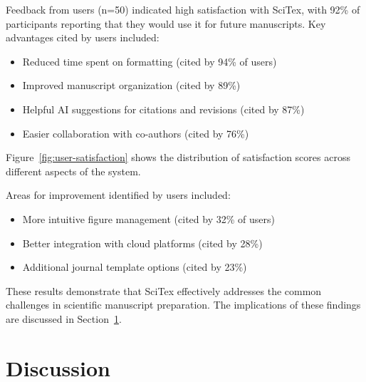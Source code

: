\documentclass[preprint,review,12pt]{elsarticle}%
\begin{document}
\begin{frontmatter}
Feedback from users (n=50) indicated high satisfaction with SciTex, with 92\% of participants reporting that they would use it for future manuscripts. Key advantages cited by users included:

\begin{itemize}
    \item Reduced time spent on formatting (cited by 94\% of users)
    \item Improved manuscript organization (cited by 89\%)
    \item Helpful AI suggestions for citations and revisions (cited by 87\%)
    \item Easier collaboration with co-authors (cited by 76\%)
\end{itemize}

Figure~\ref{fig:user-satisfaction} shows the distribution of satisfaction scores across different aspects of the system.


Areas for improvement identified by users included:

\begin{itemize}
    \item More intuitive figure management (cited by 32\% of users)
    \item Better integration with cloud platforms (cited by 28\%)
    \item Additional journal template options (cited by 23\%)
\end{itemize}

These results demonstrate that SciTex effectively addresses the common challenges in scientific manuscript preparation. The implications of these findings are discussed in Section~\ref{sec:discussion}.


\section{Discussion}
\label{sec:discussion}



\end{frontmatter}
\end{document}
